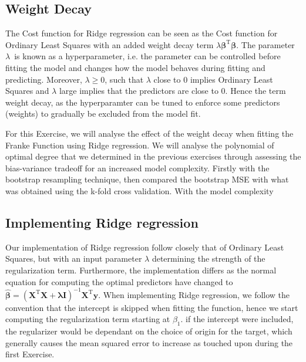 \documentclass[11pt, a4paper]{article}
\begin{document}
\subsection*{Weight Decay}
The Cost function for Ridge regression can be seen as the Cost function for Ordinary Least Squares with an added weight decay term $\lambda\bm{\beta}^\text{T}\bm{\beta}$. The parameter $\lambda$ is known as a hyperparameter, i.e. the parameter can be controlled before fitting the model and changes how the model behaves during fitting and predicting. \cite{Goodfellow2016} Moreover, $\lambda \geq 0$, such that $\lambda$ close to $0$ implies Ordinary Least Squares and $\lambda$ large implies that the predictors are close to $0$. Hence the term weight decay, as the hyperparamter can be tuned to enforce some predictors (weights) to gradually be excluded from the model fit.

For this Exercise, we will analyse the effect of the weight decay when fitting the Franke Function using Ridge regression. We will analyse the polynomial of optimal degree that we determined in the previous exercises through assessing the bias-variance tradeoff for an increased model complexity. Firstly with the bootstrap resampling technique, then compared the bootstrap MSE with what was obtained using the k-fold cross validation. With the model complexity

\subsection*{Implementing Ridge regression}
Our implementation of Ridge regression follow closely that of Ordinary Least Squares, but with an input parameter $\lambda$ determining the strength of the regularization term. Furthermore, the implementation differs as the normal equation for computing the optimal predictors have changed to $\bm{\hat{\beta}} = \left(\bm{X}^\text{T}\bm{X} + \bm{\lambda}\bm{I}\right)^{-1}\bm{X}^\text{T}\bm{y}$. When implementing Ridge regression, we follow the convention that the intercept is skipped when fitting the function, hence we start computing the regularization term starting at $\beta_1$. \cite{Geron2019} if the intercept were included, the regularizer would be dependant on the choice of origin for the target, which generally causes the mean squared error to increase as touched upon during the first Exercise.
\end{document}
